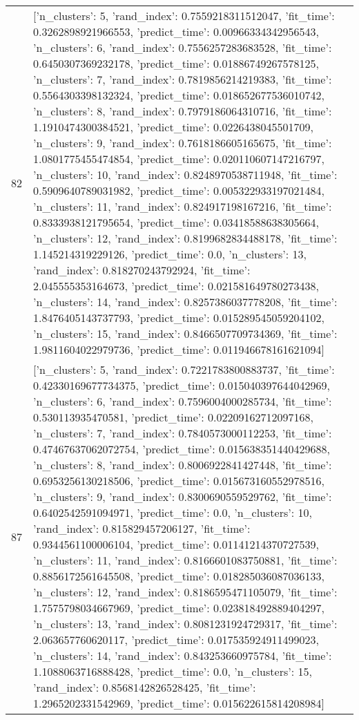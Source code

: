 \begin{tabular}{rl}
82 & [{'n_clusters': 5, 'rand_index': 0.7559218311512047, 'fit_time': 0.3262898921966553, 'predict_time': 0.00966334342956543}, {'n_clusters': 6, 'rand_index': 0.7556257283683528, 'fit_time': 0.6450307369232178, 'predict_time': 0.01886749267578125}, {'n_clusters': 7, 'rand_index': 0.7819856214219383, 'fit_time': 0.5564303398132324, 'predict_time': 0.018652677536010742}, {'n_clusters': 8, 'rand_index': 0.7979186064310716, 'fit_time': 1.1910474300384521, 'predict_time': 0.0226438045501709}, {'n_clusters': 9, 'rand_index': 0.7618186605165675, 'fit_time': 1.0801775455474854, 'predict_time': 0.020110607147216797}, {'n_clusters': 10, 'rand_index': 0.8248970538711948, 'fit_time': 0.5909640789031982, 'predict_time': 0.005322933197021484}, {'n_clusters': 11, 'rand_index': 0.824917198167216, 'fit_time': 0.8333938121795654, 'predict_time': 0.03418588638305664}, {'n_clusters': 12, 'rand_index': 0.8199682834488178, 'fit_time': 1.145214319229126, 'predict_time': 0.0}, {'n_clusters': 13, 'rand_index': 0.818270243792924, 'fit_time': 2.045555353164673, 'predict_time': 0.021581649780273438}, {'n_clusters': 14, 'rand_index': 0.8257386037778208, 'fit_time': 1.8476405143737793, 'predict_time': 0.015289545059204102}, {'n_clusters': 15, 'rand_index': 0.8466507709734369, 'fit_time': 1.9811604022979736, 'predict_time': 0.011946678161621094}] \\
87 & [{'n_clusters': 5, 'rand_index': 0.7221783800883737, 'fit_time': 0.42330169677734375, 'predict_time': 0.015040397644042969}, {'n_clusters': 6, 'rand_index': 0.7596004000285734, 'fit_time': 0.530113935470581, 'predict_time': 0.02209162712097168}, {'n_clusters': 7, 'rand_index': 0.7840573000112253, 'fit_time': 0.47467637062072754, 'predict_time': 0.015638351440429688}, {'n_clusters': 8, 'rand_index': 0.8006922841427448, 'fit_time': 0.6953256130218506, 'predict_time': 0.015673160552978516}, {'n_clusters': 9, 'rand_index': 0.8300690559529762, 'fit_time': 0.6402542591094971, 'predict_time': 0.0}, {'n_clusters': 10, 'rand_index': 0.815829457206127, 'fit_time': 0.9344561100006104, 'predict_time': 0.01141214370727539}, {'n_clusters': 11, 'rand_index': 0.8166601083750881, 'fit_time': 0.8856172561645508, 'predict_time': 0.018285036087036133}, {'n_clusters': 12, 'rand_index': 0.8186595471105079, 'fit_time': 1.7575798034667969, 'predict_time': 0.023818492889404297}, {'n_clusters': 13, 'rand_index': 0.8081231924729317, 'fit_time': 2.063657760620117, 'predict_time': 0.017535924911499023}, {'n_clusters': 14, 'rand_index': 0.843253660975784, 'fit_time': 1.1088063716888428, 'predict_time': 0.0}, {'n_clusters': 15, 'rand_index': 0.8568142826528425, 'fit_time': 1.2965202331542969, 'predict_time': 0.015622615814208984}] \\

\end{tabular}
